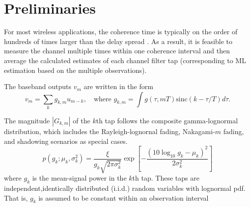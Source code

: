 \documentclass[letterpaper,10pt]{article}
\begin{document}
\pagebreak


\section{Preliminaries}

For most wireless applications, the coherence time is typically on the order of hundreds of times larger than the delay spread \cite[Ch.~9.7]{Gallager:2008}. As a result, it is feasible to measure the channel multiple times within one coherence interval and then average the calculated estimates of each channel filter tap (corresponding to ML estimation based on the multiple observations).

The baseband outputs $v_m$ are written in the form
\begin{equation}
  v_m = \sum_{k}g_{k,m}u_{m-k},\quad \text{where }g_{k,m}=\int g(\tau,mT)\text{sinc}(k-\tau/T)d\tau.
\end{equation}

The magnitude $|G_{k,m}|$ of the $k$th tap follows the composite gamma-lognormal distribution, which includes the Rayleigh-lognornal fading, Nakagami-$m$ fading, and shadowing scenarios as special cases.
\begin{equation}
  p(g_k;\mu_k,\sigma_k^2) = \frac{\xi}{g_k\sqrt{2\pi\sigma_k^2}}\exp\left[-\frac{(10\log_{10}g_k-\mu_k)^2}{2\sigma_k^2}\right]
\end{equation}
where $g_k$ is the mean-signal power in the $k$th tap. These taps are independent,identically distributed (i.i.d.) random variables with lognormal pdf. That is, $g_k$ is assumed to be constant within an observation interval
\end{document}

